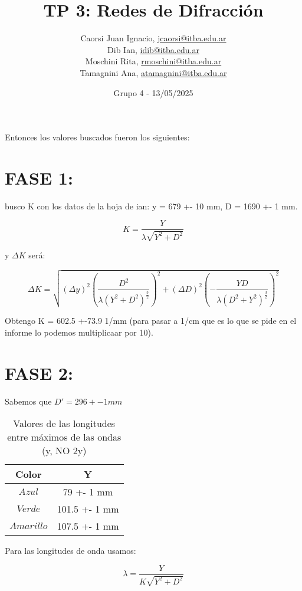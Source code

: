 \documentclass[12pt, a4paper]{article}
\title{TP 3: Redes de Difracción}
\author
{
  Caorsi Juan Ignacio, \href{jcaorsi@itba.edu.ar}{jcaorsi@itba.edu.ar} \\
  Dib Ian, \href{idib@itba.edu.ar}{idib@itba.edu.ar} \\
  Moschini Rita, \href{rmoschini@itba.edu.ar}{rmoschini@itba.edu.ar} \\
  Tamagnini Ana, \href{atamagnini@itba.edu.ar}{atamagnini@itba.edu.ar}
}
\date{Grupo 4 - 13/05/2025}
\begin{document}
\maketitle

Entonces los valores buscados fueron los siguientes:

\section{FASE 1:}

busco K con los datos de la hoja de ian: y = 679 +- 10 mm, D = 1690 +- 1 mm.

\begin{equation}
  K = \frac{Y}{{\lambda} \sqrt{Y^{2} + D^{2}}}
\label{equation5}
\end{equation} 

y ${\Delta}K$ será:

\begin{equation}
  {\Delta}K = \sqrt{({\Delta}y)^2(\frac{D^{2}}{{\lambda} \left(Y^{2} + D^{2}\right)^{\frac{3}{2}}})^2+({\Delta}D)^2(-\frac{YD}{{\lambda} \left(D^{2} + Y^{2}\right)^{\frac{3}{2}}})^2}
\label{equation5}
\end{equation}

Obtengo K = 602.5 +-73.9 1/mm (para pasar a 1/cm que es lo que se pide en el informe lo podemos multiplicaar por 10).

\section{FASE 2:}

Sabemos que $D' = 296 +- 1 mm $ 
\begin{table}[H]
  \centering
  \begin{tabular}{|c|c|}
  \hline
  Color & Y \\
  \hline
  $Azul$  & 79 +- 1 mm  \\ \hline
  $Verde$  & 101.5 +- 1 mm \\ \hline
  $Amarillo$  & 107.5 +- 1 mm \\ \hline
  \end{tabular}
  \caption{\centering Valores de las longitudes entre máximos de las ondas (y, NO 2y)}
  \label{tabla1}
\end{table}

Para las longitudes de onda usamos:


\begin{equation}
  {\lambda} = \frac{Y}{K \sqrt{Y^{2} + D^{2}}}
\label{equation5}
\end{equation}
\end{document}
